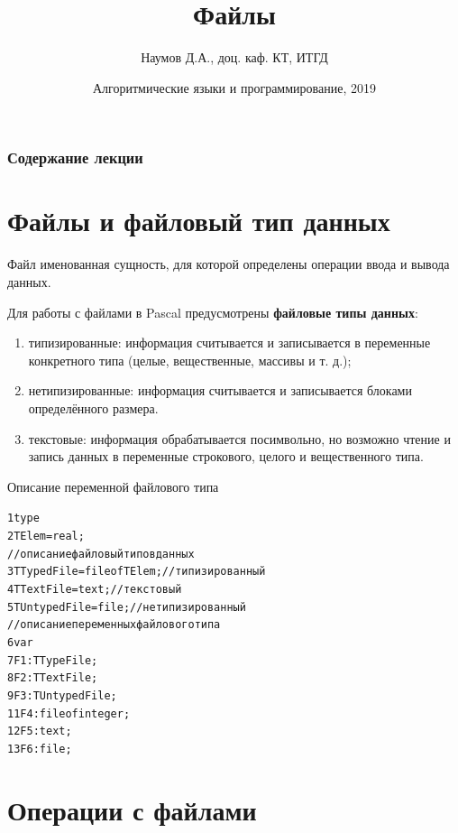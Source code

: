 \documentclass{beamer}
\title[Модули]{Файлы}
\author{Наумов Д.А., доц. каф. КТ, ИТГД }
\date[25.04.2019] {Алгоритмические языки и программирование, 2019}
\begin{document}
\begin{frame}
  \titlepage
\end{frame}
  
\begin{frame}
  \frametitle{Содержание лекции}
  \tableofcontents  
\end{frame}
  
\section{Файлы и файловый тип данных}

\begin{frame}
\begin{block}{Файл}
именованная сущность, для которой определены операции ввода и вывода данных.
\end{block}
Для работы с файлами в Pascal предусмотрены \textbf{файловые типы данных}:
\begin{enumerate}
\item типизированные: информация считывается и записывается в переменные конкретного типа (целые, вещественные, массивы и т. д.);
\item нетипизированные: информация считывается и записывается блоками определённого размера.
\item текстовые: информация обрабатывается посимвольно, но возможно чтение и запись данных в переменные строкового, целого и вещественного типа.
\end{enumerate}
\end{frame} 

\begin{frame}[fragile]{Описание переменной файлового типа}
\begin{alltt}
 1 type
 2   TElem = real; 
 //описание файловый типов данных
 3   TTypedFile = file of TElem; //типизированный
 4   TTextFile = text; //текстовый           
 5   TUntypedFile = file; //нетипизированный
 //описание переменных файлового типа
 6 var                  
 7   F1: TTypeFile;
 8   F2: TTextFile;
 9   F3: TUntypedFile;
11   F4: file of integer;   
12   F5: text;   
13   F6: file;   
\end{alltt}
\end{frame}

\section{Операции с файлами}
\end{document}

